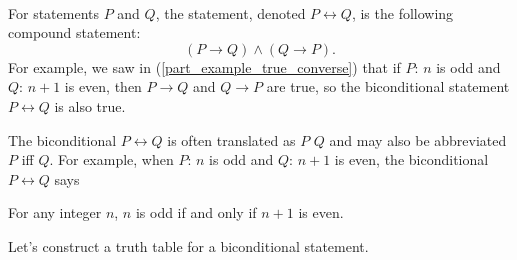 \begin{defn}
\label{defn_biconditional}
~
    \begin{apart}
    \item For statements $P$ and $Q$, the  statement, denoted $P \leftrightarrow Q$, is the following compound statement:
        $$(P \to Q) \land (Q \to P).$$
    For example, we saw in  (\ref{part_example_true_converse}) that if $P$: $n$ is odd and $Q$: $n+1$ is even, then $P \to Q$ and $Q \to P$ are true, so the biconditional statement $P \leftrightarrow Q$ is also true. 
    
    \item The biconditional $P \leftrightarrow Q$ is often translated as $P$  $Q$ and may also be abbreviated $P$ iff $Q$.  For example, when $P$: $n$ is odd and $Q$: $n+1$ is even, the biconditional $P \leftrightarrow Q$ says 
        \begin{center}
            For any integer $n$, $n$ is odd if and only if $n+1$ is even.
        \end{center}
    \end{apart} 
\end{defn}

Let's construct a truth table for a biconditional statement.

